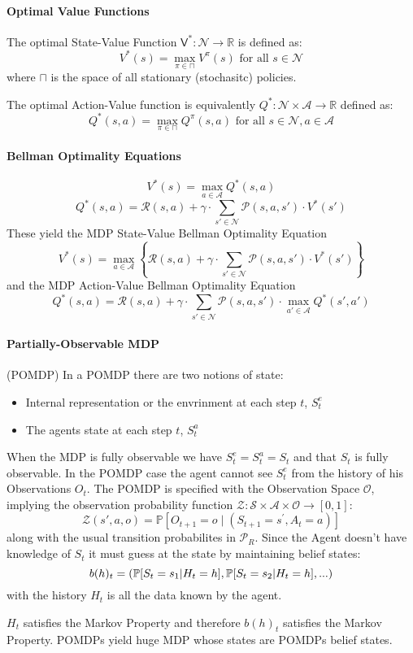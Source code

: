 \documentclass[11pt]{article}
\begin{document}
\paragraph*{Optimal Value Functions}
The optimal State-Value Function $\mathsf{V}^*: \mathcal{N} \rightarrow\mathbb{R}$ is defined as:
$$
V^*(s)=\max _{\pi \in \sqcap } V^\pi(s) \text { for all } s \in \mathcal{N}
$$
where $\sqcap$ is the space of all stationary (stochasitc) policies.

The optimal Action-Value function is equivalently $Q^*:\mathcal{N}\times\mathcal{A}\rightarrow\mathbb{R}$ defined as:
$$
Q^*(s, a)=\max _{\pi \in \sqcap} Q^\pi(s, a) \text { for all } s \in \mathcal{N}, a \in \mathcal{A}
$$

\paragraph*{Bellman Optimality Equations}
$$
V^*(s)=\max _{a \in \mathcal{A}} Q^*(s, a)
$$
$$
Q^*(s, a)=\mathcal{R}(s, a)+\gamma \cdot \sum_{s' \in \mathcal{N}} \mathcal{P}\left(s, a, s'\right) \cdot V^*\left(s'\right)
$$
These yield the MDP State-Value Bellman Optimality Equation
$$
V^*(s)=\max _{a \in \mathcal{A}}\left\{\mathcal{R}(s, a)+\gamma \cdot \sum_{s' \in \mathcal{N}} \mathcal{P}\left(s, a, s'\right) \cdot V^*\left(s'\right)\right\}
$$
and the MDP Action-Value Bellman Optimality Equation
$$
Q^*(s, a)=\mathcal{R}(s, a)+\gamma \cdot \sum_{s' \in \mathcal{N}} \mathcal{P}\left(s, a, s'\right) \cdot \max _{a' \in \mathcal{A}} Q^*\left(s', a'\right)
$$

\paragraph*{Partially-Observable MDP} (POMDP)
In a POMDP there are two notions of state:
\begin{itemize}
    \item Internal representation or the envrinment at each step $t$, $S_t^e$
    \item The agents state at each step $t$, $S_t^a$
\end{itemize}
When the MDP is fully observable we have $S_t^e = S_t^a = S_t$ and that $S_t$ is fully observable. 
In the POMDP case the agent cannot see $S_t^e$ from the history of his Observations $O_t$. 
The POMDP is specified with the Observation Space $\mathcal{O}$, implying the observation probability function $\mathcal{Z}:\mathcal{S}\times\mathcal{A}\times\mathcal{O}\rightarrow[0, 1]$:
$$
\mathcal{Z}\left(s', a, o\right)=\mathbb{P}\left[O_{t+1}=o \mid\left(S_{t+1}=s^{\prime}, A_t=a\right)\right]
$$
along with the usual transition probabilites in $\mathcal{P}_R$.
Since the Agent doesn't have knowledge of $S_t$ it must guess at the state by maintaining belief states:
$$
b(h)_t = (\P{S_t = s_1|H_t = h}, \P{S_t = s_2|H_t = h},...)
$$
with the history $H_t$ is all the data known by the agent.

$H_t$ satisfies the Markov Property and therefore $b(h)_t$ satisfies the Markov Property. POMDPs yield huge MDP whose states are POMDPs belief states.
\end{document}
